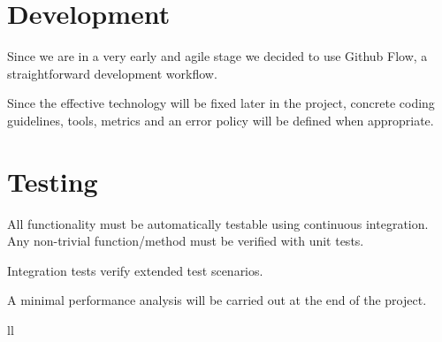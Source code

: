\section{Development}

Since we are in a very early and agile stage we decided to use Github Flow\cite{github-flow}, a straightforward development workflow.

Since the effective technology will be fixed later in the project, concrete coding guidelines, tools, metrics and an error policy will be defined when appropriate.


\section{Testing}
All functionality must be automatically testable using continuous integration. Any non-trivial function/method must be verified with unit tests.

Integration tests verify extended test scenarios.

A minimal performance analysis will be carried out at the end of the project.



\label{lastpage} %

\backmatter
{}






\listoffigures %

\listoftables %


\begin{abbreviations}{ll} %


\end{abbreviations}



